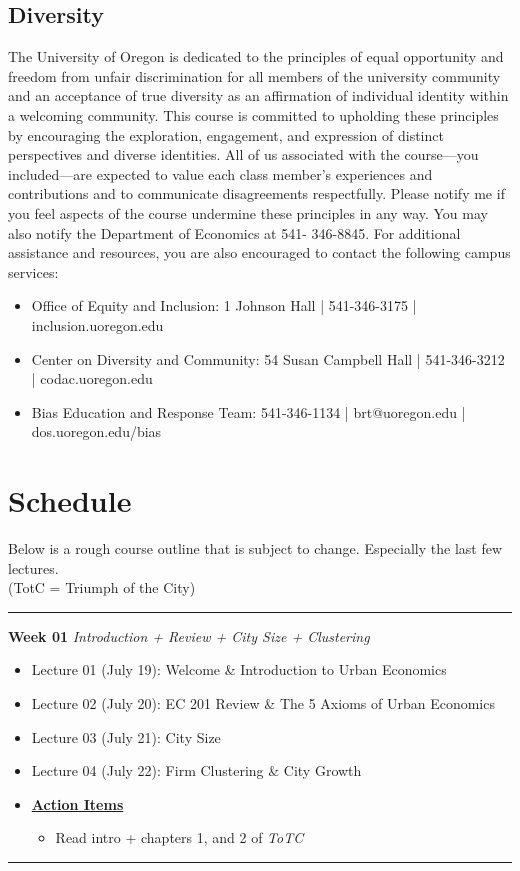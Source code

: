 \documentclass[11pt]{article}
\begin{document}
	\subsection*{Diversity}
	
	The University of Oregon is dedicated to the principles of equal opportunity and freedom from unfair discrimination for all members of the university community and an acceptance of true diversity as an affirmation of individual identity within a welcoming community. This course is committed to upholding these principles by encouraging the exploration, engagement, and expression of distinct perspectives and diverse identities.
	All of us associated with the course—you included—are expected to value each class member’s experiences and contributions and to communicate disagreements respectfully. Please notify me if you feel aspects of the course undermine these principles in any way. You may also notify the Department of Economics at 541- 346-8845. For additional assistance and resources, you are also encouraged to contact the following campus services:
	\begin{itemize}
		\item Office of Equity and Inclusion: 1 Johnson Hall | 541-346-3175 | inclusion.uoregon.edu
		\item Center on Diversity and Community: 54 Susan Campbell Hall | 541-346-3212 | codac.uoregon.edu
		\item Bias Education and Response Team: 541-346-1134 | brt@uoregon.edu | dos.uoregon.edu/bias
		
	\end{itemize}
	
	\newpage
	\section*{Schedule}
	
	Below is a rough course outline that is subject to change. Especially the last few lectures.\\ (TotC = Triumph of the City)
	
	\noindent\rule[0.5ex]{\linewidth}{1pt}
	\textbf{Week 01} \textit{Introduction + Review + City Size + Clustering}
	\begin{itemize}
		\item Lecture 01 (July 19): Welcome \& Introduction to Urban Economics
		\item Lecture 02 (July 20): EC 201 Review \& The 5 Axioms of Urban Economics
		\item Lecture 03 (July 21): City Size
		\item Lecture 04 (July 22):  Firm Clustering \& City Growth
		\item[]\underline{\textbf{Action Items}}
		\begin{itemize}
			\item Read intro + chapters 1, and 2 of \textit{ToTC}
		\end{itemize}
	\end{itemize}
	\noindent\rule[0.5ex]{\linewidth}{1pt}
	
\end{document}
